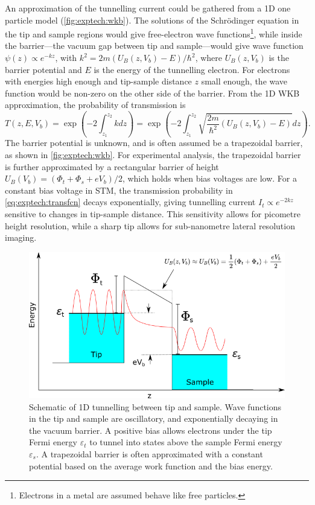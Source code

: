 \sloppy An approximation of the tunnelling current could be gathered from a \ac{1D} one particle model (\autoref{fig:exptech:wkb}). The solutions of the Schr\"odinger equation in the tip and sample regions would give free-electron wave functions\footnote{Electrons in a metal are assumed behave like free particles.}, while inside the barrier---the vacuum gap between tip and sample---would give wave function $\psi(z) \propto e^{-kz}$, with $k^2 = 2m({U_B(z,V_b) - E})/\hbar^2$, where $U_B(z,V_b)$ is the barrier potential and $E$ is the energy of the tunnelling electron. For electrons with energies high enough and tip-sample distance $z$ small enough, the wave function would be non-zero on the other side of the barrier. From the \ac{1D} \ac{WKB} approximation, the probability of transmission is
\begin{equation} \label{eq:exptech:transfcn}
T(z,E,V_b) = \exp{\left(-2\int_{z_1} ^{z_2} k dz \right)} = \exp{\left(-2  \int_{z_1}^{z_2} \sqrt{\frac{2m}{\hbar^2}\left(U_B(z,V_b) - E\right)} dz \right)}.
\end{equation}
 The barrier potential is unknown, and is often assumed be a trapezoidal barrier, as shown in \autoref{fig:exptech:wkb}. For experimental analysis, the trapezoidal barrier is further approximated by a rectangular barrier of height $U_B(V_b) = (\Phi_t + \Phi_s + eV_b)/2$, which holds when bias voltages are low. For a constant bias voltage in \ac{STM}, the transmission probability in \autoref{eq:exptech:transfcn} decays exponentially, giving tunnelling current $I_t \propto e^{-2kz}$ sensitive to changes in tip-sample distance. This sensitivity allows for picometre height resolution, while a sharp tip allows for sub-nanometre lateral resolution imaging.


\begin{figure} [t]
    \centering
    \includegraphics[width=\textwidth]{pictures/wkb.png}
    \caption{Schematic of 1D tunnelling between tip and sample. Wave functions in the tip and sample are oscillatory, and exponentially decaying in the vacuum barrier. A positive bias allows electrons under the tip Fermi energy $\varepsilon_t$ to tunnel into states above the sample Fermi energy $\varepsilon_s$.
    A trapezoidal barrier is often approximated with a constant potential based on the average work function and the bias energy.}
    \label{fig:exptech:wkb}
\end{figure}

